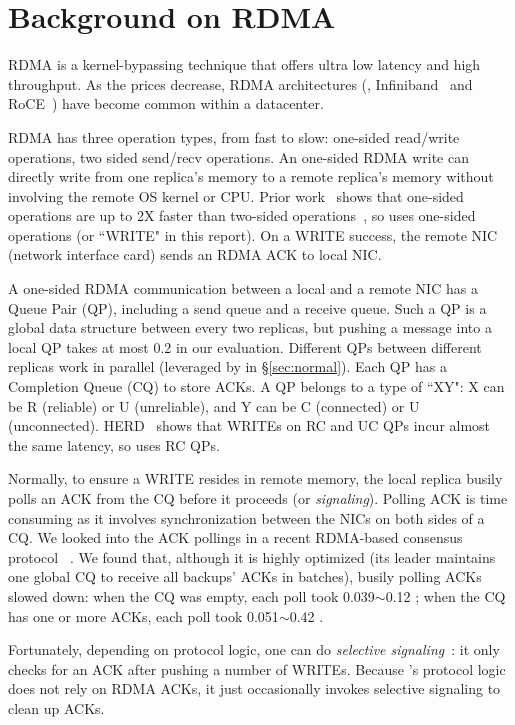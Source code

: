\section{Background on RDMA}\label{sec:background}

RDMA is a kernel-bypassing technique that offers ultra low latency and high 
throughput. As the prices decrease, RDMA architectures (\eg, 
Infiniband~\cite{infiniband} and RoCE~\cite{roce}) have become common within a 
datacenter.

RDMA has three operation types, from fast to slow: one-sided 
read/write operations, two sided send/recv operations. An one-sided RDMA write 
can directly write from one replica's memory to a remote replica's memory 
without involving the remote OS kernel or CPU. Prior work~\cite{pilaf:usenix14} 
shows that one-sided operations are up to 2X faster than two-sided 
operations~\cite{fasst:osdi16}, so \xxx uses one-sided operations (or ``WRITE" 
in this report). On a WRITE success, the remote NIC (network interface card) 
sends an RDMA ACK to local NIC.

A one-sided RDMA communication between a local and a remote NIC has
a Queue Pair (QP), including a send queue and a receive 
queue. Such a QP is a global data structure between every two replicas, but 
pushing a message into a local QP takes at most 0.2 \us in our evaluation. 
Different QPs between different replicas work in parallel (leveraged by \xxx in 
\S\ref{sec:normal}). Each QP has a Completion Queue (CQ) to store ACKs. A QP 
belongs to a type of ``XY": X can be R (reliable) or U (unreliable), and Y can 
be C (connected) or U (unconnected). HERD~\cite{herd:sigcomm14} shows that 
WRITEs on RC and UC QPs incur almost the same latency, so \xxx uses RC QPs.

Normally, to ensure a WRITE resides in remote memory, the local replica 
busily polls an ACK from the CQ before it proceeds 
(or \emph{signaling}). Polling ACK is time consuming as it involves 
synchronization between the NICs on both sides of a CQ. We looked into the ACK 
pollings in a recent RDMA-based consensus protocol \dare~\cite{dare:hpdc15}.
We found that, although it is highly optimized (its leader maintains one 
global CQ to receive all backups' ACKs in batches), busily polling ACKs slowed 
\dare down: when the CQ was empty, each poll took 0.039$\sim$0.12 \us; when the 
CQ has one or more ACKs, each poll took 0.051$\sim$0.42 \us.

Fortunately, depending on protocol logic, one can do \emph{selective 
signaling}~\cite{herd:sigcomm14}: it only checks for an ACK after pushing a 
number of WRITEs. Because \xxx's protocol logic does not rely on RDMA ACKs, 
it just occasionally invokes selective signaling to clean up ACKs.